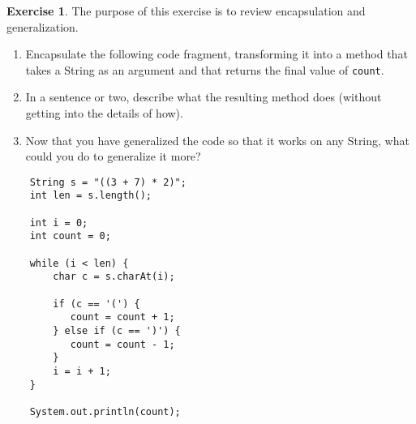 \documentclass[12pt]{book}
\theoremstyle{definition}
\newtheorem{excz}{Exercise}[chapter]
\newenvironment{exercise}{\bigskip\begin{excz}\mbox{}}{\end{excz}}
\begin{document}
\begin{exercise}
The purpose of this exercise is to review encapsulation
and generalization.

\begin{enumerate}

\item Encapsulate the following code fragment, transforming it
into a method that takes a String as an argument and that
returns the final value of {\tt count}.

\item In a sentence or two, describe what the resulting method does
(without getting into the details of how).

\item Now that you have generalized the code
so that it works on any String, what could you do to
generalize it more?

\end{enumerate}

\begin{lstlisting}
    String s = "((3 + 7) * 2)";
    int len = s.length();

    int i = 0;
    int count = 0;

    while (i < len) {
        char c = s.charAt(i);

        if (c == '(') {
           count = count + 1;
        } else if (c == ')') {
           count = count - 1;
        }
        i = i + 1;
    }

    System.out.println(count);
\end{lstlisting}
\end{exercise}
\end{document}
